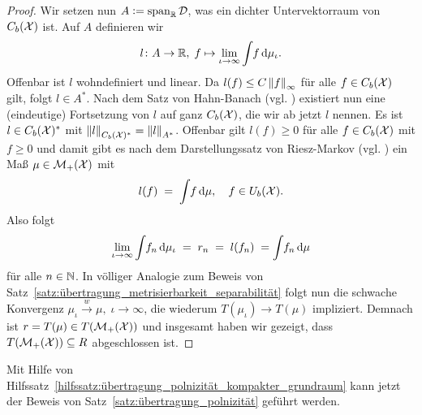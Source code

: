 \documentclass[../thesis/thesis.tex]{subfiles}
\begin{document}
\begin{proof}
		Wir setzen nun $A \vcentcolon = \mathrm{span}_{\mathbb{R}} \, \mathcal{D}$, was ein dichter Untervektorraum von $C_b(\mathcal{X})$ ist. Auf $A$ definieren wir
		\[ l \colon A \to \mathbb{R}, \; f \mapsto \lim_{\iota \to \infty} \int_{} \, f \, \mathrm{d}\mu_\iota  \text{.} \]
		Offenbar ist $l$ wohndefiniert und linear. Da $l(f) \leq C \left\lVert f\right\rVert_\infty$ für alle $f \in C_b(\mathcal{X})$ gilt, folgt $l \in A^\ast$. Nach dem Satz von Hahn-Banach (vgl. \cite[Folgerung 5.5.2]{Simon.2015})
		existiert nun eine (eindeutige) Fortsetzung von $l$ auf ganz $C_b(\mathcal{X})$, die wir ab jetzt $l$ nennen. Es ist $l \in C_b(\mathcal{X})^\ast$ 
		mit $\left\lVert l\right\rVert_{C_b(\mathcal{X})^\ast} = \left\lVert l\right\rVert_{A^\ast}$. Offenbar gilt $l(f) \geq 0$ für alle $f \in C_b(\mathcal{X})$ mit $f \geq 0$ und damit gibt es 
		nach dem Darstellungssatz von Riesz-Markov (vgl. \cite[Satz 4.8.8]{Simon.2015}) ein Maß $\mu \in \mathcal{M}_{+}(\mathcal{X})$ mit 
		\[ l(f) \; = \; \int_{} \, f \, \mathrm{d}\mu, \quad f \in U_b(\mathcal{X}) \text{.} \]
		Also folgt
		\[ \lim_{\iota \to \infty} \int_{} \, f_n \, \mathrm{d}\mu_\iota \; = \; r_n \; = \; l(f_n) \; = \int_{} \, f_n \, \mathrm{d}\mu \]
		für alle $n \in \mathbb{N}$. In völliger Analogie zum Beweis von Satz~\ref{satz:übertragung_metrisierbarkeit_separabilität} folgt nun die schwache Konvergenz $\mu_\iota \xrightarrow{w} \mu, \; \iota \to \infty$,
		die wiederum $T(\mu_\iota) \to T(\mu)$ impliziert. Demnach ist $r = T(\mu) \in T(\mathcal{M}_{+}(\mathcal{X}))$ und insgesamt haben wir gezeigt, dass $T(\mathcal{M}_{+}(\mathcal{X})) \subseteq R$ abgeschlossen ist.
	\end{proof}

	Mit Hilfe von Hilfssatz~\ref{hilfssatz:übertragung_polnizität_kompakter_grundraum} kann jetzt der Beweis von Satz~\ref{satz:übertragung_polnizität} geführt werden.
\end{document}
